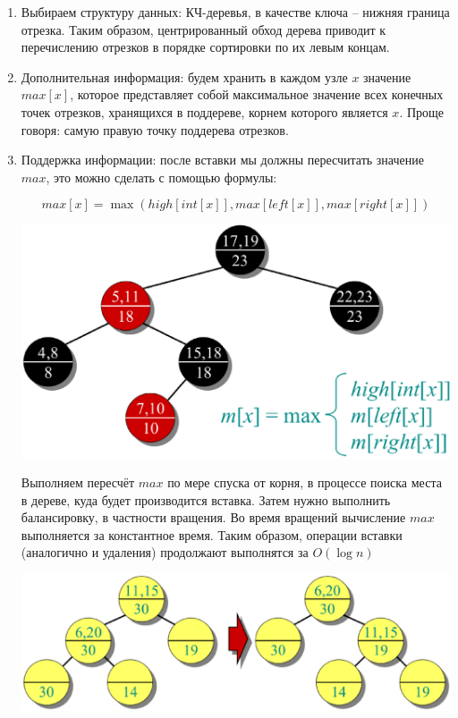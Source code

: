 \documentclass[a4paper,11pt]{article}
\begin{document}
\begin{enumerate}
\item Выбираем структуру данных: КЧ-деревья, в качестве ключа -- нижняя граница
  отрезка. Таким образом, центрированный обход дерева приводит к перечислению
  отрезков в порядке сортировки по их левым концам.
\item Дополнительная информация: будем хранить в каждом узле $x$ значение
  $max[x]$, которое представляет собой максимальное значение всех конечных точек
  отрезков, хранящихся в поддереве, корнем которого является $x$. Проще говоря:
  самую правую точку поддерева отрезков.
\item Поддержка информации: после вставки мы должны пересчитать значение $max$,
  это можно сделать с помощью формулы:

  $$
  max[x] = \max(high[int[x]], max[left[x]], max[right[x]])
  $$

  \begin{center}
    \includegraphics[width=5in]{lecture11/rb.eps}
  \end{center}
  
  Выполняем пересчёт $max$ по мере спуска от корня, в процессе поиска места в
  дереве, куда будет производится вставка. Затем нужно выполнить балансировку, в
  частности вращения. Во время вращений вычисление $max$ выполняется за
  константное время. Таким образом, операции вставки (аналогично и удаления)
  продолжают выполнятся за $O(\log n)$

  \begin{center}
    \includegraphics[width=5in]{lecture11/rotations-fixup.eps}
  \end{center}


\end{enumerate}
\end{document}
